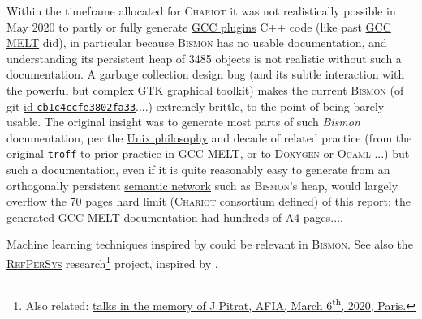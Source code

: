 Within the timeframe allocated for \textsc{Chariot} it was not
realistically possible in May 2020 to partly or fully generate
\href{https://gcc.gnu.org/onlinedocs/gccint/Plugins.html}{GCC plugins}
C++ code (like past
\href{http://starynkevitch.net/Basile/gcc-melt/}{GCC MELT} did), in
particular because \textsc{Bismon} has no usable documentation, and
understanding its persistent heap of 3485 objects is not realistic
without such a documentation. A garbage collection
\cite{Jones:2016:GC-handbook} design bug (and its subtle interaction
with the powerful but complex \href{https://www.gtk.org/}{GTK}
graphical toolkit) makes the current \textsc{Bismon} (of git
\href{https://github.com/bstarynk/bismon/commit/cb1c4ccfe3802fa330d48fc97c2913943736ba2f}{id
  \texttt{cb1c4ccfe3802fa33}}....) extremely brittle, to the point of
being barely usable. The original insight was to generate most parts
of such \emph{Bismon} documentation, per the
\href{https://en.wikipedia.org/wiki/Unix_philosophy}{Unix philosophy}
and decade of related practice (from the original
\href{https://www.troff.org/}{\texttt{troff}} to prior practice in
\href{http://starynkevitch.net/Basile/gcc-melt/}{GCC MELT}, or to
\href{https://www.doxygen.nl/}{\textsc{Doxygen}} or
\href{http://ocaml.org/}{\textsc{Ocaml}} ...) but such a
documentation, even if it is quite reasonably easy to generate from an
orthogonally persistent
\href{https://en.wikipedia.org/wiki/Semantic_network}{semantic
  network} such as \textsc{Bismon}'s heap, would largely overflow the
70 pages hard limit (\textsc{Chariot} consortium defined) of this
report: the generated
\href{http://starynkevitch.net/Basile/gcc-melt/}{GCC MELT}
documentation had hundreds of A4 pages....

Machine learning techniques inspired by \cite{zhang:2019:learned}
could be relevant in \textsc{Bismon}. See also the
\href{http://refpersys.org/}{\textsc{RefPerSys}}  research\footnote{Also related:
  \href{https://afia.asso.fr/journee-hommage-j-pitrat/}{talks in the
    memory of J.Pitrat, AFIA, March 6\textsuperscript{th}, 2020,
    Paris.}} project, inspired by \cite{Pitrat:1996:FGCS,
  Pitrat:2009:AST, Pitrat:2009:ArtifBeings, Starynkevitch-1990-EUM}.

\medskip

